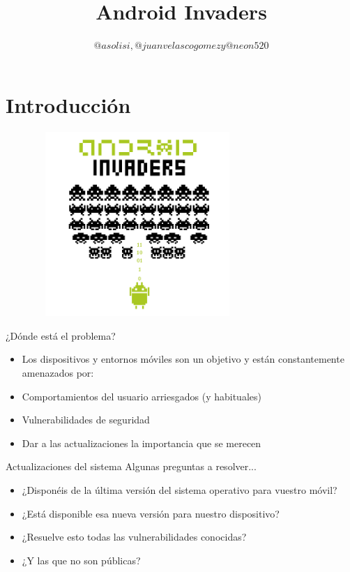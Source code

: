 \documentclass{beamer}
\title[Charla Android]{Android Invaders}
\author[LPB]{$@asolisi, @juanvelascogomez y @neon520$}
\institute[UGR]{Universidad de Granada}
\begin{document}
\maketitle

\section*{Introducción}
\begin{frame}
	\includegraphics[width=10cm, height=7cm]{androidInvaders_nobackground_black.png}
\end{frame}

\begin{frame}{¿Dónde está el problema?}
	\begin{itemize}[<+-|alert@+>]
		
	\item Los dispositivos y entornos móviles son un objetivo y están constantemente amenazados por:
	\item Comportamientos del usuario arriesgados (y habituales)
	\item Vulnerabilidades de seguridad
	\item Dar a las actualizaciones la importancia que se merecen
	
	\end{itemize}
\end{frame}

\begin{frame}{Actualizaciones del sistema}
	Algunas preguntas a resolver...
	
\begin{itemize}[<+-|alert@+>]
	
	\item ¿Disponéis de la última versión del sistema operativo para vuestro móvil?
	\item ¿Está disponible esa nueva versión para nuestro dispositivo?
	\item ¿Resuelve esto todas las vulnerabilidades conocidas?
	\item ¿Y las que no son públicas?
	
\end{itemize}
\end{frame}
\end{document}
